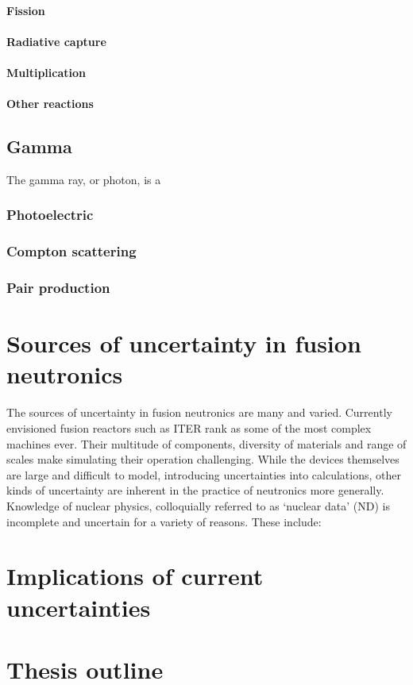 \paragraph{Fission}

\paragraph{Radiative capture}

\paragraph{Multiplication}

\paragraph{Other reactions}

\subsection{Gamma}
The gamma ray, or photon, is a 

\subsubsection{Photoelectric}

\subsubsection{Compton scattering}

\subsubsection{Pair production}

\section{Sources of uncertainty in fusion neutronics}
The sources of uncertainty in fusion neutronics are many and varied. Currently envisioned fusion reactors such as ITER rank as some of the most complex machines ever. Their multitude of components, diversity of materials and range of scales make simulating their operation challenging. While the devices themselves are large and difficult to model, introducing uncertainties into calculations, other kinds of uncertainty are inherent in the practice of neutronics more generally. Knowledge of nuclear physics, colloquially referred to as `nuclear data' (ND) is incomplete and uncertain for a variety of reasons. These include:  

\section{Implications of current uncertainties}

\section{Thesis outline}
